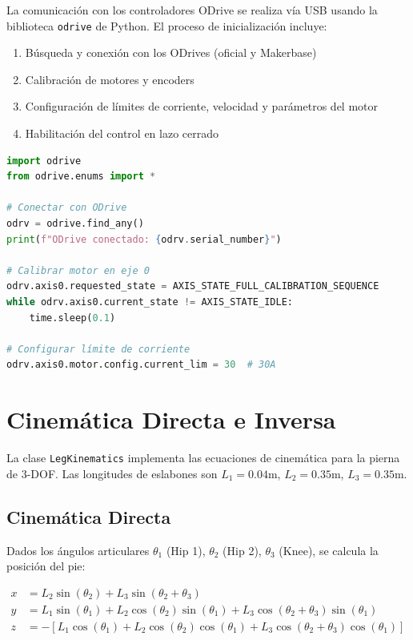 La comunicación con los controladores ODrive se realiza vía USB usando la biblioteca \texttt{odrive} de Python. El proceso de inicialización incluye:

\begin{enumerate}
    \item Búsqueda y conexión con los ODrives (oficial y Makerbase)
    \item Calibración de motores y encoders
    \item Configuración de límites de corriente, velocidad y parámetros del motor
    \item Habilitación del control en lazo cerrado
\end{enumerate}

\begin{lstlisting}[language=Python, caption=Ejemplo de conexión con ODrive]
import odrive
from odrive.enums import *

# Conectar con ODrive
odrv = odrive.find_any()
print(f"ODrive conectado: {odrv.serial_number}")

# Calibrar motor en eje 0
odrv.axis0.requested_state = AXIS_STATE_FULL_CALIBRATION_SEQUENCE
while odrv.axis0.current_state != AXIS_STATE_IDLE:
    time.sleep(0.1)

# Configurar límite de corriente
odrv.axis0.motor.config.current_lim = 30  # 30A
\end{lstlisting}

\section{Cinemática Directa e Inversa}

La clase \texttt{LegKinematics} implementa las ecuaciones de cinemática para la pierna de 3-DOF. Las longitudes de eslabones son $L_1 = 0.04$m, $L_2 = 0.35$m, $L_3 = 0.35$m.

\subsection{Cinemática Directa}
Dados los ángulos articulares $\theta_1$ (Hip 1), $\theta_2$ (Hip 2), $\theta_3$ (Knee), se calcula la posición del pie:

\begin{align}
x &= L_2 \sin(\theta_2) + L_3 \sin(\theta_2 + \theta_3) \\
y &= L_1 \sin(\theta_1) + L_2 \cos(\theta_2) \sin(\theta_1) + L_3 \cos(\theta_2 + \theta_3) \sin(\theta_1) \\
z &= -[L_1 \cos(\theta_1) + L_2 \cos(\theta_2) \cos(\theta_1) + L_3 \cos(\theta_2 + \theta_3) \cos(\theta_1)]
\end{align}


